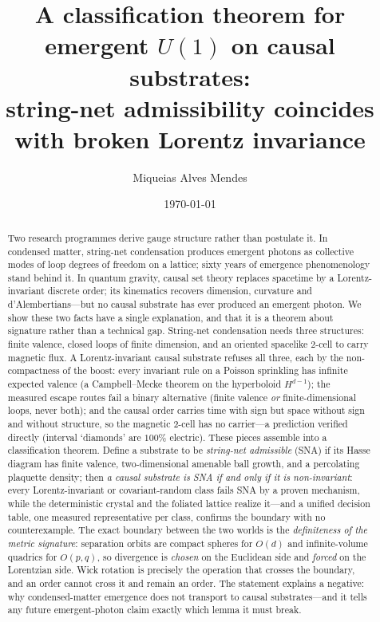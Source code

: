 \documentclass[aps,prd,reprint,nofootinbib,superscriptaddress,floatfix]{revtex4-2}
\begin{document}
\title{A classification theorem for emergent $U(1)$ on causal substrates:\\
string-net admissibility coincides with broken Lorentz invariance}

\author{Miqueias Alves Mendes}
\date{\today}

\begin{abstract}
Two research programmes derive gauge structure rather than postulate it. In condensed
matter, string-net condensation produces emergent photons as collective modes of loop
degrees of freedom on a lattice; sixty years of emergence phenomenology stand behind it.
In quantum gravity, causal set theory replaces spacetime by a Lorentz-invariant discrete
order; its kinematics recovers dimension, curvature and d'Alembertians---but no causal
substrate has ever produced an emergent photon. We show these two facts have a single
explanation, and that it is a theorem about signature rather than a technical gap.
String-net condensation needs three structures: finite valence, closed loops of finite
dimension, and an oriented spacelike 2-cell to carry magnetic flux. A Lorentz-invariant
causal substrate refuses all three, each by the non-compactness of the boost: every
invariant rule on a Poisson sprinkling has infinite expected valence (a Campbell--Mecke
theorem on the hyperboloid $H^{d-1}$); the measured escape routes fail a binary
alternative (finite valence \emph{or} finite-dimensional loops, never both); and the
causal order carries time with sign but space without sign and without structure, so the
magnetic 2-cell has no carrier---a prediction verified directly (interval `diamonds' are
$100\%$ electric). These pieces assemble into a classification theorem. Define a
substrate to be \emph{string-net admissible} (SNA) if its Hasse diagram has finite
valence, two-dimensional amenable ball growth, and a percolating plaquette density;
then \emph{a causal substrate is SNA if and only if it is non-invariant}: every
Lorentz-invariant or covariant-random class fails SNA by a proven mechanism, while the
deterministic crystal and the foliated lattice realize it---and a unified decision
table, one measured representative per class, confirms the boundary with no
counterexample. The exact boundary between the two worlds is the \emph{definiteness of
the metric signature}: separation orbits are compact spheres for $O(d)$ and infinite-volume
quadrics for $O(p,q)$, so divergence is \emph{chosen} on the Euclidean side and
\emph{forced} on the Lorentzian side. Wick rotation is precisely the operation that
crosses the boundary, and an order cannot cross it and remain an order. The statement
explains a negative: why condensed-matter emergence does not transport to causal
substrates---and it tells any future emergent-photon claim exactly which lemma it must
break.
\end{abstract}
\end{document}
